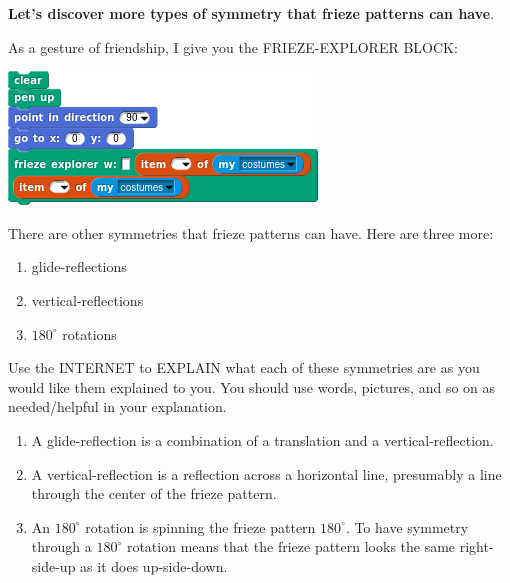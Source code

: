\documentclass[noauthor,nooutcomes,hints,handout]{ximera}
\begin{document}
\textbf{Let's discover more types of symmetry that
  frieze patterns can have}.

As a gesture of friendship, I give you the FRIEZE-EXPLORER BLOCK:
\begin{center}
  \includegraphics{friezeExplorerSCRIPT.png}
\end{center}




\mynewpage



\begin{question}
  There are other symmetries that frieze patterns can have. Here are
  three more:
  \begin{enumerate}
  \item glide-reflections
  \item vertical-reflections
  \item $180^\circ$ rotations
  \end{enumerate}
  Use the INTERNET to EXPLAIN what each of these symmetries are as you
  would like them explained to you. You should use words, pictures,
  and so on as needed/helpful in your explanation.
  \begin{freeResponse}
    \begin{enumerate}
    \item A glide-reflection is a combination of a translation and a
      vertical-reflection.
    \item A vertical-reflection is a reflection across a horizontal
      line, presumably a line through the center of the frieze
      pattern.
    \item An $180^\circ$ rotation is spinning the frieze pattern
      $180^\circ$. To have symmetry through a $180^\circ$ rotation
      means that the frieze pattern looks the same right-side-up as it
      does up-side-down.
    \end{enumerate}
  \end{freeResponse}
\end{question}

\mynewpage
\end{document}
